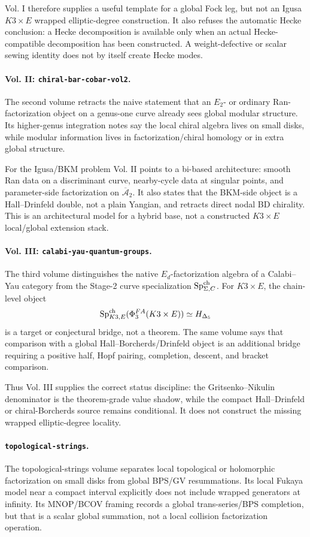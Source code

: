 Vol. I therefore supplies a useful template for a global Fock leg, but
not an Igusa \(K3\times E\) wrapped elliptic-degree construction.  It
also refuses the automatic Hecke conclusion: a Hecke decomposition is
available only when an actual Hecke-compatible decomposition has been
constructed.  A weight-defective or scalar sewing identity does not by
itself create Hecke modes.

\paragraph{Vol. II: \texttt{chiral-bar-cobar-vol2}.}
The second volume retracts the naive statement that an \(E_2\)- or
ordinary Ran-factorization object on a genus-one curve already sees
global modular structure.  Its higher-genus integration notes say the
local chiral algebra lives on small disks, while modular information
lives in factorization/chiral homology or in extra global structure.

For the Igusa/BKM problem Vol. II points to a bi-based architecture:
smooth Ran data on a discriminant curve, nearby-cycle data at singular
points, and parameter-side factorization on \(\overline{\mathcal A}_2\).
It also states that the BKM-side object is a Hall--Drinfeld double, not
a plain Yangian, and retracts direct nodal BD chirality.  This is an
architectural model for a hybrid base, not a constructed
\(K3\times E\) local/global extension stack.

\paragraph{Vol. III: \texttt{calabi-yau-quantum-groups}.}
The third volume distinguishes the native \(E_d\)-factorization algebra
of a Calabi--Yau category from the Stage-2 curve specialization
\(\mathrm{Sp}^{\mathrm{ch}}_{\Sigma,C}\).  For \(K3\times E\), the chain-level object
\[
\mathrm{Sp}^{\mathrm{ch}}_{K3,E}(\Phi^{FA}_3(K3\times E))\simeq H_{\Delta_5}
\]
is a target or conjectural bridge, not a theorem.  The same volume says
that comparison with a global Hall--Borcherds/Drinfeld object is an
additional bridge requiring a positive half, Hopf pairing, completion,
descent, and bracket comparison.

Thus Vol. III supplies the correct status discipline: the
Gritsenko--Nikulin denominator is the theorem-grade value shadow, while
the compact Hall--Drinfeld or chiral-Borcherds source remains
conditional.  It does not construct the missing wrapped elliptic-degree
locality.

\paragraph{\texttt{topological-strings}.}
The topological-strings volume separates local topological or
holomorphic factorization on small disks from global BPS/GV
resummations.  Its local Fukaya model near a compact interval explicitly
does not include wrapped generators at infinity.  Its MNOP/BCOV framing
records a global trans-series/BPS completion, but that is a scalar
global summation, not a local collision factorization operation.

